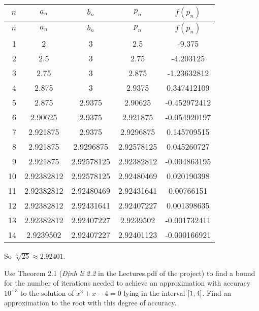 \documentclass[../../../../Assignments.tex]{subfiles}
\begin{document}
\begin{solution}
    \begin{longtable}{r S[table-format=1.8] S[table-format=1.8] S[table-format=1.8] S[table-format=-1.9]}
        \toprule
        \(n\)  &   {\(a_n\)}   &   {\(b_n\)}   &   {\(p_n\)}   &  {\(f(p_n)\)}  \\
        \midrule
        \endfirsthead
        \(n\)  &   {\(a_n\)}   &   {\(b_n\)}   &   {\(p_n\)}   &  {\(f(p_n)\)}  \\
        \midrule
          &  2            &  3            &  2.5          &  -9.375        \\
            2  &  2.5          &  3            &  2.75         &  -4.203125     \\
            3  &  2.75         &  3            &  2.875        &  -1.23632812   \\
            4  &  2.875        &  3            &  2.9375       &   0.347412109  \\
            5  &  2.875        &  2.9375       &  2.90625      &  -0.452972412  \\
            6  &  2.90625      &  2.9375       &  2.921875     &  -0.054920197  \\
            7  &  2.921875     &  2.9375       &  2.9296875    &   0.145709515  \\
            8  &  2.921875     &  2.9296875    &  2.92578125   &   0.045260727  \\
            9  &  2.921875     &  2.92578125   &  2.92382812   &  -0.004863195  \\
           10  &  2.92382812   &  2.92578125   &  2.92480469   &   0.020190398  \\
           11  &  2.92382812   &  2.92480469   &  2.92431641   &   0.00766151   \\
           12  &  2.92382812   &  2.92431641   &  2.92407227   &   0.001398635  \\
           13  &  2.92382812   &  2.92407227   &  2.9239502    &  -0.001732411  \\
           14  &  2.9239502    &  2.92407227   &  2.92401123   &  -0.000166921  \\
       \bottomrule
    \end{longtable}

    So \(\sqrt[3]{25} \approx \num{2.92401}\).
\end{solution}

\begin{exercise}
    Use Theorem 2.1 (\emph{Định lí 2.2} in the Lectures.pdf of the project) to
    find a bound for the number of iterations needed to achieve an approximation
    with accuracy \(10^{-3}\) to the solution of \(x^3 + x − 4 = 0\) lying in
    the interval \(\interval{1}{4}\). Find an approximation to the root with
    this degree of accuracy.
\end{exercise}
\end{document}

